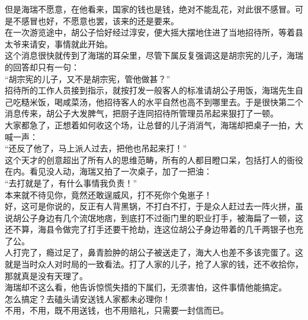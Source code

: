 \begin{multicols}{\theparacolNo}
但是海瑞不愿意，在他看来，国家的钱也是钱，绝对不能乱花，对此很不感冒。可是不感冒也好，不愿意也罢，该来的还是要来。\\

在一次游览途中，胡公子恰好经过淳安，便大摇大摆地住进了当地招待所，等着县太爷来请安，事情就此开始。\\

这个消息很快就传到了海瑞的耳朵里，尽管下属反复强调这是胡宗宪的儿子，海瑞的回答却只有一句：\\

“胡宗宪的儿子，又不是胡宗宪，管他做甚？”\\

招待所的工作人员接到指示，就按打发一般客人的标准请胡公子用饭，海瑞先生自己吃糙米饭，喝咸菜汤，他招待客人的水平自然也高不到哪里去。于是很快第二个消息传来，胡公子大发脾气，把厨子连同招待所管理员吊起来狠打了一顿。\\

大家都急了，正想着如何收这个场，让总督的儿子消消气，海瑞却把桌子一拍，大喊一声：\\

“还反了他了，马上派人过去，把他也吊起来打！”\\

这个天才的创意超出了所有人的思维范畴，所有的人都目瞪口呆，包括打人的衙役在内。看见没人动，海瑞又拍了一次桌子，加了一把油：\\

“去打就是了，有什么事情我负责！”\\

本来就不待见你，竟然还敢逞威风，打不死你个兔崽子！\\

好，这可是你说的，反正有人背黑锅，不打白不打，于是众人赶过去一阵火拼，虽说胡公子身边有几个流氓地痞，到底打不过衙门里的职业打手，被海扁了一顿，这还不算，海县令做完了打手还要干抢劫，连这位胡公子身边带着的几千两银子也充了公。\\

人打完了，瘾过足了，鼻青脸肿的胡公子被送走了，海大人也差不多该完蛋了。这就是当时众人对时局的一致看法。打了人家的儿子，抢了人家的钱，还不收拾你，那就真是没有天理了。\\

海瑞却不这么看，他告诉惊慌失措的下属们，无须害怕，这件事情他能搞定。\\

怎么搞定？去磕头请安送钱人家都未必理你！\\

不用，不用，既不用送钱，也不用赔礼，只需要一封信而已。\\


\end{multicols}
